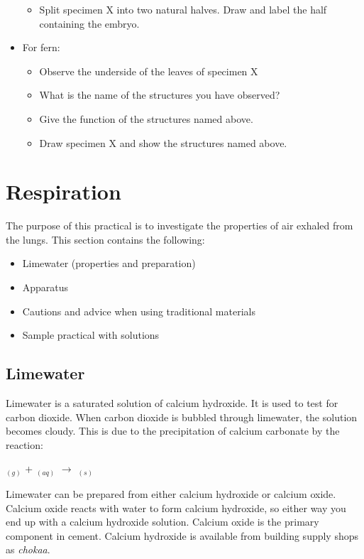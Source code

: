 \begin{itemize}
\begin{itemize}
\item{Split specimen X into two natural halves. Draw and label the half containing the embryo.}
\end{itemize}
\item{For fern:}
\begin{itemize}
\item{Observe the underside of the leaves of specimen X}
\item{What is the name of the structures you have observed?}
\item{Give the function of the structures named above.}
\item{Draw specimen X and show the structures named above.}
\end{itemize}
\end{itemize}
\section{Respiration}

The purpose of this practical is to investigate the properties of air exhaled from the lungs. This section contains the following:

\begin{itemize}
\item{Limewater (properties and preparation)}
\item{Apparatus}
\item{Cautions and advice when using traditional materials}
\item{Sample practical with solutions}
\end{itemize}

\subsection{Limewater}
Limewater is a saturated solution of calcium hydroxide. It is used to test for carbon dioxide. When carbon dioxide is bubbled through limewater, the solution becomes cloudy. This is due to the precipitation of calcium carbonate by the reaction:

$_{(g)}$ + $_{(aq)}$ $\longrightarrow$ $_{(s)}$

Limewater can be prepared from either calcium hydroxide or calcium oxide. Calcium oxide reacts with water to form calcium hydroxide, so either way you end up with a calcium hydroxide solution. Calcium oxide is the primary component in cement. Calcium hydroxide is available from building supply shops as \textit{chokaa}.

